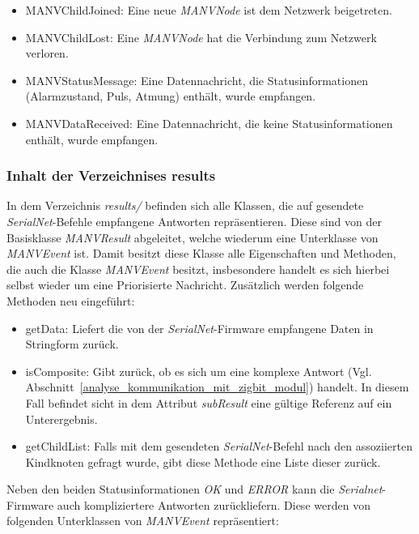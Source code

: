     \begin{itemize}
        \item{MANVChildJoined:} Eine neue \emph{MANVNode} ist dem Netzwerk beigetreten.
        \item{MANVChildLost:} Eine \emph{MANVNode} hat die Verbindung zum Netzwerk verloren.
        \item{MANVStatusMessage:} Eine Datennachricht, die Statusinformationen (Alarmzustand, Puls, Atmung) enthält,
                                  wurde empfangen.
        \item{MANVDataReceived:} Eine Datennachricht, die keine Statusinformationen enthält, wurde empfangen.
    \end{itemize}

    \subsubsection{Inhalt der Verzeichnises results}

    In dem Verzeichnis \emph{results/} befinden sich alle Klassen, die auf gesendete \emph{SerialNet}-Befehle empfangene Antworten
    repräsentieren. Diese sind von der Basisklasse \emph{MANVResult} abgeleitet, welche wiederum eine Unterklasse von \emph{MANVEvent} ist.
    Damit besitzt diese Klasse alle Eigenschaften und Methoden, die auch die Klasse \emph{MANVEvent} besitzt, insbesondere handelt es sich
    hierbei selbst wieder um eine Priorisierte Nachricht. Zusätzlich werden folgende Methoden neu eingeführt:

    \begin{itemize}
        \item{getData:} Liefert die von der \emph{SerialNet}-Firmware empfangene Daten in Stringform zurück. 
        \item{isComposite:} Gibt zurück, ob es sich um eine komplexe Antwort (Vgl. Abschnitt~\ref{analyse_kommunikation_mit_zigbit_modul})
                            handelt. In diesem Fall befindet sicht in dem Attribut \emph{subResult} eine gültige Referenz
                            auf ein Unterergebnis.
        \item{getChildList:} Falls mit dem gesendeten \emph{SerialNet}-Befehl nach den assoziierten Kindknoten gefragt wurde,
                             gibt diese Methode eine Liste dieser zurück.
    \end{itemize}

    Neben den beiden Statusinformationen \emph{OK} und \emph{ERROR} kann die \emph{Serialnet}-Firmware auch kompliziertere Antworten
    zurückliefern. Diese werden von folgenden Unterklassen von \emph{MANVEvent} repräsentiert:
        
